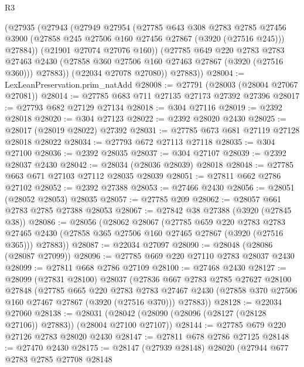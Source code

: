 \begin{lexlean}{R3}
\begin{coremodule}
          (@27935
            (@27943
              (@27949
                @27954
                (@27785
                  @643
                  @308
                  @2783
                  @2785
                  @27456
                  @3900
                  (@27858 @245 @27506 @160 @27456 @27867 (@3920 (@27516 @245)))
                  @27884))
              (@21901 @27074 @27076 @160))
            (@27785
              @649
              @220
              @2783
              @2783
              @27463
              @2430
              (@27858 @360 @27506 @160 @27463 @27867 (@3920 (@27516 @360)))
              @27883))
          (@22034 @27078 @27080))
        @27883))
@28004 := LexLeanPreservation.prim_natAdd
@28008 := @27791 (@28003 (@28004 @27067 @27081))
@28014 := @27785 @683 @711 @27135 @27173 @27392 @27396
@28017 := @27793 @682 @27129 @27134
@28018 := @304 @27116
@28019 := @2392 @28018
@28020 := @304 @27123
@28022 := @2392 @28020 @2430
@28025 := @28017 (@28019 @28022) @27392
@28031 := @27785 @673 @681 @27119 @27128 @28018 @28022
@28034 := @27793 @672 @27113 @27118
@28035 := @304 @27100
@28036 := @2392 @28035
@28037 := @304 @27107
@28039 := @2392 @28037 @2430
@28042 := @28034 (@28036 @28039) @28018
@28048 := @27785 @663 @671 @27103 @27112 @28035 @28039
@28051 := @27811 @662 @2786 @27102
@28052 := @2392 @27388
@28053 := @27466 @2430
@28056 := @28051 (@28052 @28053) @28035
@28057 := @27785 @209
@28062 := @28057 @661 @2783 @2785 @27388 @28053
@28067 := @27842 @38 @27388 (@3920 (@27845 @38))
@28086 := @28056
    (@28062
      @28067
      (@27785
        @659
        @220
        @2783
        @2783
        @27465
        @2430
        (@27858 @365 @27506 @160 @27465 @27867 (@3920 (@27516 @365)))
        @27883))
@28087 := @22034 @27097
@28090 := @28048 (@28086 (@28087 @27099))
@28096 := @27785 @669 @220 @27110 @2783 @28037 @2430
@28099 := @27811 @668 @2786 @27109
@28100 := @27468 @2430
@28127 := @28099
    (@27831 @28100)
    @28037
    (@27836
      @667
      @2783
      @2785
      @27627
      @28100
      @27848
      (@27785
        @665
        @220
        @2783
        @2783
        @27467
        @2430
        (@27858 @370 @27506 @160 @27467 @27867 (@3920 (@27516 @370)))
        @27883))
@28128 := @22034 @27060
@28138 := @28031 (@28042 (@28090 (@28096 (@28127 (@28128 @27106)) @27883)) (@28004 @27100 @27107))
@28144 := @27785 @679 @220 @27126 @2783 @28020 @2430
@28147 := @27811 @678 @2786 @27125
@28148 := @27470 @2430
@28175 := @28147
    (@27939 @28148)
    @28020
    (@27944
      @677
      @2783
      @2785
      @27708
      @28148

\end{coremodule}
\end{lexlean}
